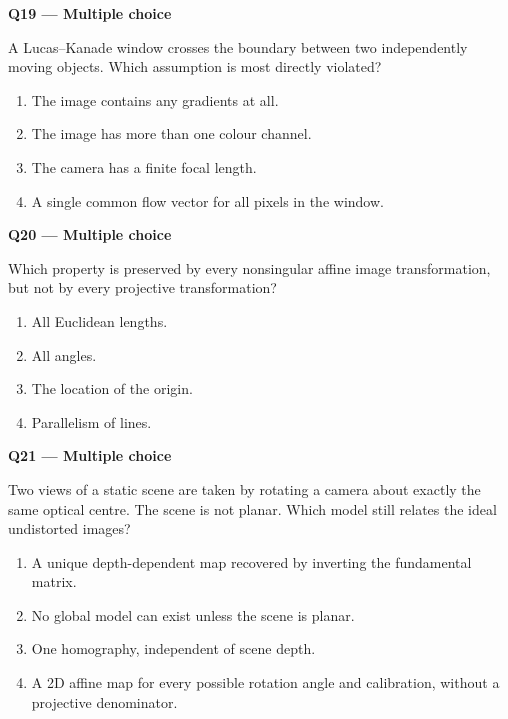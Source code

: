 \documentclass[11pt,a4paper]{article}
\begin{document}
\par\vspace{12pt}
\begin{minipage}{\linewidth}
\textbf{Q19 — Multiple choice}\par\smallskip
A Lucas–Kanade window crosses the boundary between two independently moving objects. Which assumption is most directly violated?
\begin{enumerate}[label=\textbf{\Alph*.}]
\item The image contains any gradients at all.
\item The image has more than one colour channel.
\item The camera has a finite focal length.
\item A single common flow vector for all pixels in the window.
\end{enumerate}
\end{minipage}
\par\vspace{12pt}
\begin{minipage}{\linewidth}
\textbf{Q20 — Multiple choice}\par\smallskip
Which property is preserved by every nonsingular affine image transformation,\allowbreak{} but not by every projective transformation?
\begin{enumerate}[label=\textbf{\Alph*.}]
\item All Euclidean lengths.
\item All angles.
\item The location of the origin.
\item Parallelism of lines.
\end{enumerate}
\end{minipage}
\par\vspace{12pt}
\begin{minipage}{\linewidth}
\textbf{Q21 — Multiple choice}\par\smallskip
Two views of a static scene are taken by rotating a camera about exactly the same optical centre. The scene is not planar. Which model still relates the ideal undistorted images?
\begin{enumerate}[label=\textbf{\Alph*.}]
\item A unique depth-dependent map recovered by inverting the fundamental matrix.
\item No global model can exist unless the scene is planar.
\item One homography,\allowbreak{} independent of scene depth.
\item A 2D affine map for every possible rotation angle and calibration,\allowbreak{} without a projective denominator.
\end{enumerate}
\end{minipage}
\end{document}
